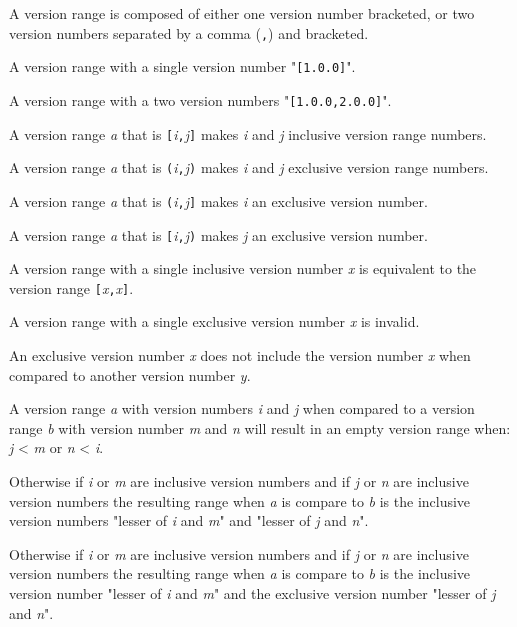 \pnum
A version range is composed of either one version number bracketed,
or two version numbers separated by a comma (\verb|,|) and bracketed.

\begin{example}
A version range with a single version number "\verb|[1.0.0]|".
\end{example}

\begin{example}
A version range with a two version numbers "\verb|[1.0.0,2.0.0]|".
\end{example}

\pnum
A version range \emph{a} that is \verb|[|\emph{i}\verb|,|\emph{j}\verb|]| makes
\emph{i} and \emph{j} inclusive version range numbers.

\pnum
A version range \emph{a} that is \verb|(|\emph{i}\verb|,|\emph{j}\verb|)| makes
\emph{i} and \emph{j} exclusive version range numbers.

\pnum
A version range \emph{a} that is \verb|(|\emph{i}\verb|,|\emph{j}\verb|]| makes
\emph{i} an exclusive version number.

\pnum
A version range \emph{a} that is \verb|[|\emph{i}\verb|,|\emph{j}\verb|)| makes
\emph{j} an exclusive version number.

\pnum
A version range with a single inclusive version number \emph{x} is equivalent
to the version range \verb|[|\emph{x}\verb|,|\emph{x}\verb|]|.

\pnum
A version range with a single exclusive version number \emph{x} is invalid.

\pnum
An exclusive version number \emph{x} does not include the version number
\emph{x} when compared to another version number \emph{y}.

\pnum
A version range \emph{a} with version numbers \emph{i} and \emph{j} when
compared to a version range \emph{b} with version number \emph{m} and \emph{n}
will result in an empty version range when: \emph{j} < \emph{m} or
\emph{n} < \emph{i}.

\pnum
Otherwise if \emph{i} or \emph{m} are inclusive version numbers and if \emph{j}
or \emph{n} are inclusive version numbers the resulting range when \emph{a} is
compare to \emph{b} is the inclusive version numbers "lesser of \emph{i} and
\emph{m}" and "lesser of \emph{j} and \emph{n}".

\pnum
Otherwise if \emph{i} or \emph{m} are inclusive version numbers and if \emph{j}
or \emph{n} are inclusive version numbers the resulting range when \emph{a} is
compare to \emph{b} is the inclusive version number "lesser of \emph{i} and
\emph{m}" and the exclusive version number "lesser of \emph{j} and \emph{n}".

